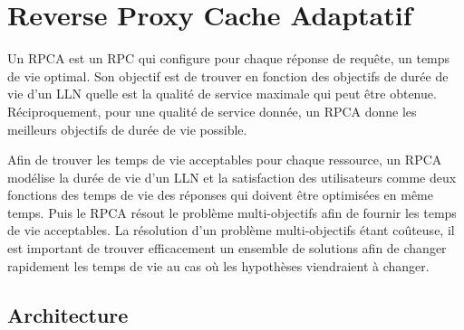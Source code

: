 \section{Reverse Proxy Cache Adaptatif}
\label{cache:rpca}

Un \ac{RPCA} est un \ac{RPC} qui configure pour chaque réponse de requête, un temps de vie optimal.
Son objectif est de trouver en fonction des objectifs de durée de vie d'un \ac{LLN} quelle est la qualité de service maximale qui peut être obtenue.
Réciproquement, pour une qualité de service donnée, un \ac{RPCA} donne les meilleurs objectifs de durée de vie possible.

Afin de trouver les temps de vie acceptables pour chaque ressource, un \ac{RPCA} modélise la durée de vie d'un \ac{LLN} et la satisfaction des utilisateurs comme deux fonctions des temps de vie des réponses qui doivent être optimisées en même temps.
Puis le \ac{RPCA} résout le problème multi-objectifs afin de fournir les temps de vie acceptables.
La résolution d'un problème multi-objectifs étant coûteuse, il est important de trouver efficacement un ensemble de solutions afin de changer rapidement les temps de vie au cas où les hypothèses viendraient à changer.

\subsection{Architecture}
\label{cache:architecture}

